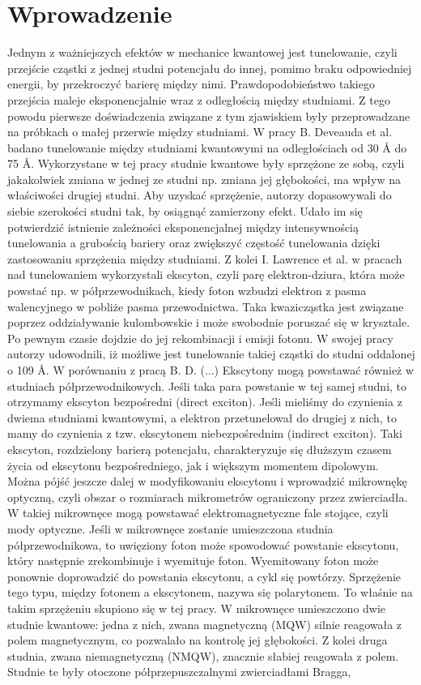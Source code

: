 \documentclass[licencjacka]{pracamgr}
\begin{document}
\chapter*{Wprowadzenie}
Jednym z ważniejszych efektów w mechanice kwantowej jest tunelowanie, czyli przejście cząstki z jednej studni potencjału do innej, pomimo braku odpowiedniej energii, by przekroczyć barierę między nimi. Prawdopodobieństwo takiego przejścia maleje eksponencjalnie wraz z odległością między studniami. Z tego powodu pierwsze doświadczenia związane z tym zjawiskiem były przeprowadzane na próbkach o małej przerwie między studniami. W pracy B. Deveauda et al. \cite{1990} badano tunelowanie między studniami kwantowymi na odległościach od 30 \r{A} do 75 \r{A}. Wykorzystane w tej pracy studnie kwantowe były sprzężone ze sobą, czyli jakakolwiek zmiana w jednej ze studni np. zmiana jej głębokości, ma wpływ na właściwości drugiej studni. Aby uzyskać sprzężenie, autorzy dopasowywali do siebie szerokości studni tak, by osiągnąć zamierzony efekt. Udało im się potwierdzić istnienie zależności eksponencjalnej między intensywnością tunelowania a grubością bariery oraz zwiększyć częstość tunelowania dzięki zastosowaniu sprzężenia między studniami. Z kolei I. Lawrence et al. \cite{1994} w pracach nad tunelowaniem wykorzystali ekscyton, czyli parę elektron-dziura, która może powstać np. w półprzewodnikach, kiedy foton wzbudzi elektron z pasma walencyjnego w pobliże pasma przewodnictwa. Taka kwazicząstka jest związane poprzez oddziaływanie kulombowskie i może swobodnie poruszać się w krysztale. Po pewnym czasie dojdzie do jej rekombinacji i emisji fotonu. W swojej pracy autorzy udowodnili, iż możliwe jest tunelowanie takiej cząstki do studni oddalonej o 109 \r{A}. W porównaniu z pracą B. D. (...) Ekscytony mogą powstawać również w studniach półprzewodnikowych. Jeśli taka para powstanie w tej samej studni, to otrzymamy ekscyton bezpośredni (direct exciton). Jeśli mieliśmy do czynienia z dwiema studniami kwantowymi, a elektron przetunelował do drugiej z nich, to mamy do czynienia z tzw. ekscytonem niebezpośrednim (indirect exciton). Taki ekscyton, rozdzielony barierą potencjału, charakteryzuje się dłuższym czasem życia od ekscytonu bezpośredniego, jak i większym momentem dipolowym. Można pójść jeszcze dalej w modyfikowaniu ekscytonu i wprowadzić mikrownękę optyczną, czyli obszar o rozmiarach mikrometrów ograniczony przez zwierciadła. W takiej mikrownęce mogą powstawać elektromagnetyczne fale stojące, czyli mody optyczne. Jeśli w mikrownęce zostanie umieszczona studnia półprzewodnikowa, to uwięziony foton może spowodować powstanie ekscytonu, który następnie zrekombinuje i wyemituje foton. Wyemitowany foton może ponownie doprowadzić do powstania ekscytonu, a cykl się powtórzy. Sprzężenie tego typu, między fotonem a ekscytonem, nazywa się polarytonem. To właśnie na takim sprzężeniu skupiono się w tej pracy. W mikrownęce umieszczono dwie studnie kwantowe: jedna z nich, zwana magnetyczną (MQW) silnie reagowała z polem magnetycznym, co pozwalało na kontrolę jej głębokości. Z kolei druga studnia, zwana niemagnetyczną (NMQW), znacznie słabiej reagowała z polem. Studnie te były otoczone półprzepuszczalnymi zwierciadłami Bragga, 
\end{document}

